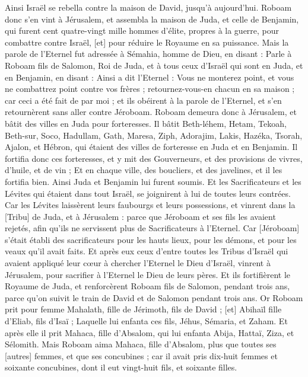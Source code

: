 \begin{multicols}{2}
Ainsi Israël se rebella contre la maison de David, jusqu'à aujourd'hui.
\VerseOne{}Roboam donc s'en vint à Jérusalem, et assembla la maison de Juda, et celle de Benjamin, qui furent cent quatre-vingt mille hommes d'élite, propres à la guerre, pour combattre contre Israël, [et] pour réduire le Royaume en sa puissance.
Mais la parole de l'Eternel fut adressée à Sémahia, homme de Dieu, en disant :
Parle à Roboam fils de Salomon, Roi de Juda, et à tous ceux d'Israël qui sont en Juda, et en Benjamin, en disant :
Ainsi a dit l'Eternel : Vous ne monterez point, et vous ne combattrez point contre vos frères ; retournez-vous-en chacun en sa maison ; car ceci a été fait de par moi ; et ils obéirent à la parole de l'Eternel, et s'en retournèrent sans aller contre Jéroboam.
Roboam demeura donc à Jérusalem, et bâtit des villes en Juda pour forteresses.
Il bâtit Beth-léhem, Hetam, Tekoah,
Beth-sur, Soco, Hadullam,
Gath, Maresa, Ziph,
Adorajim, Lakis, Hazéka,
Tsorah, Ajalon, et Hébron, qui étaient des villes de forteresse en Juda et en Benjamin.
Il fortifia donc ces forteresses, et y mit des Gouverneurs, et des provisions de vivres, d'huile, et de vin ;
Et en chaque ville, des boucliers, et des javelines, et il les fortifia bien. Ainsi Juda et Benjamin lui furent soumis.
Et les Sacrificateurs et les Lévites qui étaient dans tout Israël, se joignirent à lui de toutes leurs contrées.
Car les Lévites laissèrent leurs faubourgs et leurs possessions, et vinrent dans la [Tribu] de Juda, et à Jérusalem : parce que Jéroboam et ses fils les avaient rejetés, afin qu'ils ne servissent plus de Sacrificateurs à l'Eternel.
Car [Jéroboam] s'était établi des sacrificateurs pour les hauts lieux, pour les démons, et pour les veaux qu'il avait faits.
Et après eux ceux d'entre toutes les Tribus d'Israël qui avaient appliqué leur cœur à chercher l'Eternel le Dieu d'Israël, vinrent à Jérusalem, pour sacrifier à l'Eternel le Dieu de leurs pères.
Et ils fortifièrent le Royaume de Juda, et renforcèrent Roboam fils de Salomon, pendant trois ans, parce qu'on suivit le train de David et de Salomon pendant trois ans.
Or Roboam prit pour femme Mahalath, fille de Jérimoth, fils de David ; [et] Abihaïl fille d'Eliab, fils d'Isaï ;
Laquelle lui enfanta ces fils, Jéhus, Sémaria, et Zaham.
Et après elle il prit Mahaca, fille d'Absalom, qui lui enfanta Abija, Hattaï, Ziza, et Sélomith.
Mais Roboam aima Mahaca, fille d'Absalom, plus que toutes ses [autres] femmes, et que ses concubines ; car il avait pris dix-huit femmes et soixante concubines, dont il eut vingt-huit fils, et soixante filles.

\end{multicols}
